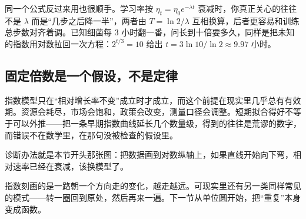 同一个公式反过来用也很顺手。学习率按 \(\eta_t=\eta_0e^{-\lambda t}\) 衰减时，你真正关心的往往不是 \(\lambda\) 而是``几步之后降一半''，两者由 \(T=\ln 2/\lambda\) 互相换算，后者更容易和训练总步数对齐着调。已知细菌每 \(3\) 小时翻一番，问长到十倍要多久，同样是把未知的指数用对数拉回一次方程：\(2^{t/3}=10\) 给出 \(t=3\ln 10/\ln 2\approx 9.97\) 小时。

\subsection{固定倍数是一个假设，不是定律}

指数模型只在``相对增长率不变''成立时才成立，而这个前提在现实里几乎总有有效期。资源会耗尽，市场会饱和，政策会改变，测量口径会调整。短期拟合得好不等于可以外推——把一条早期指数曲线延长几个数量级，得到的往往是荒谬的数字，而错误不在数学里，在那句没被检查的假设里。

诊断办法就是本节开头那张图：把数据画到对数纵轴上，如果直线开始向下弯，相对速率已经在衰减，该换模型了。

指数刻画的是一路朝一个方向走的变化，越走越远。可现实里还有另一类同样常见的模式——转一圈回到原处，然后再来一遍。下一节从单位圆开始，把``重复''本身变成函数。
